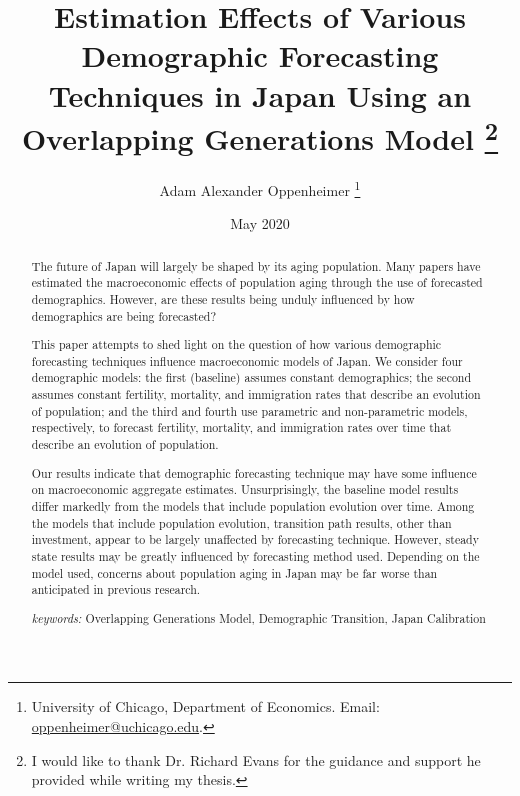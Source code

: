 \documentclass[10pt]{article}
\numberwithin{equation}{subsection}
\begin{document}
\begin{titlepage}
\title{Estimation Effects of Various Demographic Forecasting Techniques in Japan Using an Overlapping Generations Model 
         \thanks{I would like to thank Dr. Richard Evans for the guidance and support he provided while writing my thesis.}
      }
\author{
   Adam Alexander Oppenheimer
   \footnote{University of Chicago,
      Department of Economics. Email:
      \href{mailto:oppenheimer@uchicago.edu}
      {oppenheimer@uchicago.edu}.
   }
}
\date{May 2020 \\
   \scriptsize{}}
\maketitle
\vspace{-9mm}
\begin{abstract}
\small{The future of Japan will largely be shaped by its aging population. Many papers have estimated the macroeconomic effects of population aging through the use of forecasted demographics. However, are these results being unduly influenced by how demographics are being forecasted?
\par This paper attempts to shed light on the question of how various demographic forecasting techniques influence macroeconomic models of Japan. We consider four demographic models: the first (baseline) assumes constant demographics; the second assumes constant fertility, mortality, and immigration rates that describe an evolution of population; and the third and fourth use parametric and non-parametric models, respectively, to forecast fertility, mortality, and immigration rates over time that describe an evolution of population.
\par Our results indicate that demographic forecasting technique may have some influence on macroeconomic aggregate estimates. Unsurprisingly, the baseline model results differ markedly from the models that include population evolution over time. Among the models that include population evolution, transition path results, other than investment, appear to be largely unaffected by forecasting technique. However, steady state results may be greatly influenced by forecasting method used. Depending on the model used, concerns about population aging in Japan may be far worse than anticipated in previous research.

\vspace{3mm}

\noindent\textit{keywords:}\:
   Overlapping Generations Model,
   Demographic Transition,
   Japan Calibration

\vspace{3mm}

}

\end{abstract}
\thispagestyle{empty}
\end{titlepage}
\end{document}
